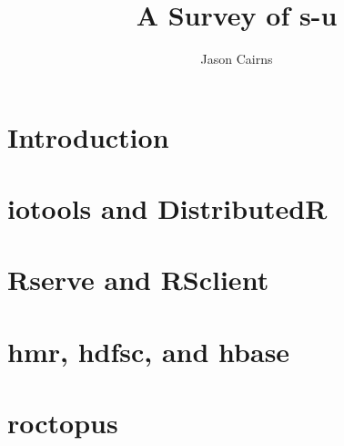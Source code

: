 \documentclass[10pt, a4paper]{article}
\begin{document}
\author{Jason Cairns}
  
\title{A Survey of s-u}
\maketitle

\section{Introduction}


\section{iotools and DistributedR}


\section{Rserve and RSclient}


\section{hmr, hdfsc, and hbase}


\section{roctopus}

\end{document}
